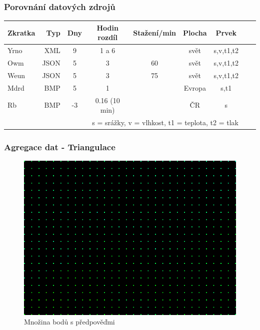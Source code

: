\documentclass{beamer}
\begin{document}
	\begin{frame}
		\frametitle{Porovnání datových zdrojů}
		
		\begin{tabular} {l r c c c c c c c}
			
			Zkratka & Typ & Dny & Hodin rozdíl & Stažení/min & Plocha & Prvek \\
			\hline
			Yrno & XML & 9 & 1 a 6 & & svět & s,v,t1,t2 \\ 
			Owm & JSON & 5 & 3 & 60 & svět & s,v,t1,t2 \\ 
			Weun & JSON & 5 & 3 & 75 & svět & s,v,t1,t2 \\ 
			Mdrd & BMP & 5 & 1 &  & Evropa & s,t1 \\ 
			Rb & BMP & -3 & 0.16 (10 min)& & ČR & s \\ 
			\multicolumn{7}{r}{\footnotesize *s = srážky, v = vlhkost, t1 = teplota, t2 = tlak}\\
		\end{tabular}
	\end{frame}

	\begin{frame}
		\frametitle{Agregace dat - Triangulace}
		
		\begin{figure}
			
			\includegraphics[scale=0.5]{figures/bmp_body.png}
			\caption{Množina bodů s předpověďmi}
			
		\end{figure}
	
	\end{frame}
\end{document}
